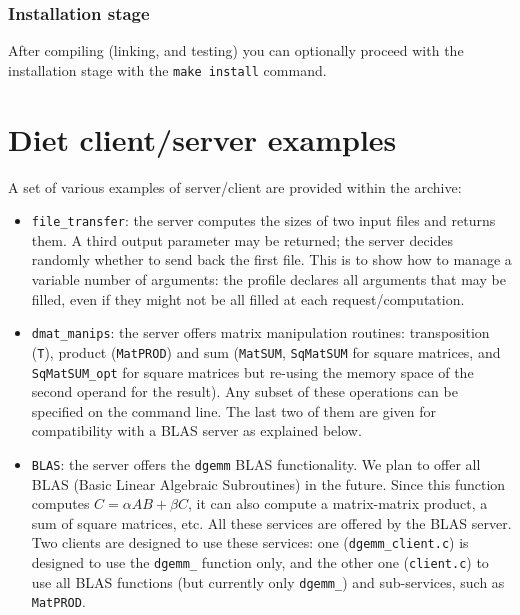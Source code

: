 \subsubsection{Installation stage}
After compiling (linking, and testing) you can optionally proceed with
the installation stage with the \verb+make install+ command.

\section{Diet client/server examples}
\label{section:diet-examples}

A set of various examples of \diet server/client are provided within
the \diet archive:
\begin{itemize}
\item{\texttt{file\_transfer}}: the server computes the sizes of two
  input files and returns them. A third output parameter may be
  returned; the server decides randomly whether to send back the first
  file. This is to show how to manage a variable number of arguments:
  the profile declares all arguments that may be filled, even if they
  might not be all filled at each request/computation.

\item{\texttt{dmat\_manips}}: the server offers matrix manipulation
  routines: transposition (\texttt{T}), product (\texttt{MatPROD}) and
  sum (\texttt{MatSUM}, \texttt{SqMatSUM} for square matrices, and
  \texttt{SqMatSUM\_opt} for square matrices but re-using the memory
  space of the second operand for the result). Any subset of these
  operations can be specified on the command line. The last two of
  them are given for compatibility with a BLAS server as explained
  below.
  
\item{\texttt{BLAS}}: the server offers the \texttt{dgemm} BLAS
  functionality. We plan to offer all BLAS (Basic Linear Algebraic
  Subroutines) in the future. Since this function computes $C = \alpha
  AB + \beta C$, it can also compute a matrix-matrix product, a sum of
  square matrices, etc. All these services are offered by the BLAS
  server. Two clients are designed to use these services: one
  (\texttt{dgemm\_client.c}) is designed to use the \texttt{dgemm\_}
  function only, and the other one (\texttt{client.c}) to use all BLAS
  functions (but currently only \texttt{dgemm\_}) and sub-services,
  such as \texttt{MatPROD}.
  

\end{itemize}
